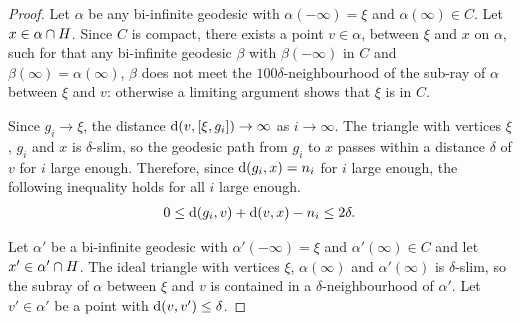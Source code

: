 \documentclass[a4paper]{article}
\begin{document}
\begin{proof}
  Let $\alpha$ be any bi-infinite geodesic with $\alpha(-\infty)=\xi$ and 
  $\alpha(\infty)\in C$. Let $x \in \alpha \cap H$. Since $C$ is
  compact, there exists a point $v \in \alpha$, between $\xi$ and $x$ on
  $\alpha$, such for that any bi-infinite geodesic $\beta$ with
  $\beta(-\infty)$ in $C$ and $\beta(\infty) = \alpha(\infty)$, $\beta$ does
  not meet the $100\delta$-neighbourhood of the sub-ray of $\alpha$ between
  $\xi$ and $v$: otherwise a limiting argument shows that $\xi$ is in $C$.

  Since $g_i \to \xi$, the distance $\operatorname{d}(v, [\xi, g_i]) \to \infty$ as
  $i\to\infty$. The triangle with vertices $\xi$, $g_i$ and $x$ is
  $\delta$-slim, so the geodesic path from $g_i$ to $x$ passes within a
  distance $\delta$ of $v$ for $i$ large enough. Therefore, since $\operatorname{d}(g_i,
  x) = n_i$ for $i$ large enough, the following inequality holds for all $i$
  large enough.
  \begin{align*}
    0 \leq \operatorname{d}(g_i, v) + \operatorname{d}(v, x) - n_i \leq 2\delta.
  \end{align*}

  Let $\alpha'$ be a bi-infinite geodesic with $\alpha'(-\infty) = \xi$ and
  $\alpha'(\infty) \in C$ and let $x' \in \alpha' \cap H$. The ideal
  triangle with vertices $\xi$, $\alpha(\infty)$ and $\alpha'(\infty)$ is
  $\delta$-slim, so the subray of $\alpha$ between $\xi$ and $v$ is contained
  in a $\delta$-neighbourhood of $\alpha'$.  Let $v' \in \alpha'$ be a point
  with $\operatorname{d}(v, v') \leq \delta$. 
  

\end{proof}
\end{document}
